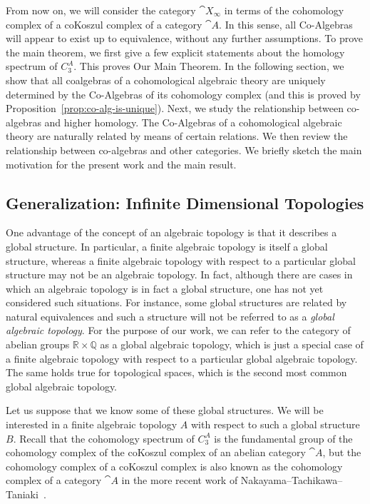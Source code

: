 \documentclass[a4paper,reqno,oneside]{article}
\begin{document}
From now on, we will consider the category $\cat{X}_{\infty}$ in terms of the cohomology complex of a coKoszul complex of a category $\cat{A}$. In this sense, all Co-Algebras will appear to exist up to equivalence, without any further assumptions. To prove the main theorem, we first give a few explicit statements about the homology spectrum of $C_{3}^{A}$. This proves Our Main Theorem. In the following section, we show that all coalgebras of a cohomological algebraic theory are uniquely determined by the Co-Algebras of its cohomology complex (and this is proved by Proposition~\ref{prop:co-alg-is-unique}). Next, we study the relationship between co-algebras and higher homology. The Co-Algebras of a cohomological algebraic theory are naturally related by means of certain relations. We then review the relationship between co-algebras and other categories. We briefly sketch the main motivation for the present work and the main result.

\subsection{Generalization: Infinite Dimensional Topologies}
One advantage of the concept of an algebraic topology is that it describes a global structure. In particular, a finite algebraic topology is itself a global structure, whereas a finite algebraic topology with respect to a particular global structure may not be an algebraic topology. In fact, although there are cases in which an algebraic topology is in fact a global structure, one has not yet considered such situations. For instance, some global structures are related by natural equivalences and such a structure will not be referred to as a \emph{global algebraic topology}. For the purpose of our work, we can refer to the category of abelian groups $\mathbb{R}\times \mathbb{Q}$ as a global algebraic topology, which is just a special case of a finite algebraic topology with respect to a particular global algebraic topology. The same holds true for topological spaces, which is the second most common global algebraic topology.

Let us suppose that we know some of these global structures. We will be interested in a finite algebraic topology $A$ with respect to such a global structure $B$. Recall that the cohomology spectrum of $C_{3}^{A}$ is the fundamental group of the cohomology complex of the coKoszul complex of an abelian category $\cat{A}$, but the cohomology complex of a coKoszul complex is also known as the cohomology complex of a category $\cat{A}$ in the more recent work of Nakayama--Tachikawa--Taniaki~\cite{Nakayama1995,Nakayama1998}.
\end{document}

